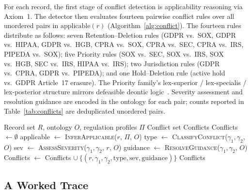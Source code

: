 \documentclass{ieeeaccess}
\begin{document}
For each record, the first stage of conflict detection is applicability reasoning via Axiom~1. The detector then evaluates fourteen pairwise conflict rules over all unordered pairs in $\mathrm{applicable}(r)$ (Algorithm~\ref{alg:conflict}). The fourteen rules distribute as follows: seven Retention--Deletion rules (GDPR vs.\ SOX, GDPR vs.\ HIPAA, GDPR vs.\ HGB, CPRA vs.\ SOX, CPRA vs.\ SEC, CPRA vs.\ IRS, PIPEDA vs.\ SOX); five Priority rules (SOX vs.\ SEC, SOX vs.\ IRS, SOX vs.\ HGB, SEC vs.\ IRS, HIPAA vs.\ IRS); two Jurisdiction rules (GDPR vs.\ CPRA, GDPR vs.\ PIPEDA); and one Hold--Deletion rule (active hold vs.\ GDPR Article~17 erasure). The Priority family's lex-superior / lex-specialis / lex-posterior structure mirrors defeasible deontic logic~\cite{governatori2013}. Severity assessment and resolution guidance are encoded in the ontology for each pair; counts reported in Table~\ref{tab:conflicts} are deduplicated unordered pairs.

\begin{algorithm}[t]
\caption{Conflict Detection}
\label{alg:conflict}
\begin{algorithmic}[1]
\Require Record set $R$, ontology $O$, regulation profiles $\Pi$
\Ensure Conflict set Conflicts
\State Conflicts $\gets \emptyset$
    \State applicable $\gets$ \textsc{InferApplicable}($r$, $\Pi$, $O$)
            \State type $\gets$ \textsc{ClassifyConflict}($\gamma_1, \gamma_2$, $O$)
            \State sev $\gets$ \textsc{AssessSeverity}($\gamma_1, \gamma_2$, $r$, $O$)
            \State guidance $\gets$ \textsc{ResolveGuidance}($\gamma_1, \gamma_2$, $O$)
            \State Conflicts $\gets$ Conflicts $\cup\ \{(r, \gamma_1, \gamma_2, \mathrm{type}, \mathrm{sev}, \mathrm{guidance})\}$
        \EndIf
    \EndFor
\EndFor
\State \Return Conflicts
\end{algorithmic}
\end{algorithm}

\subsection{A Worked Trace}
\end{document}
